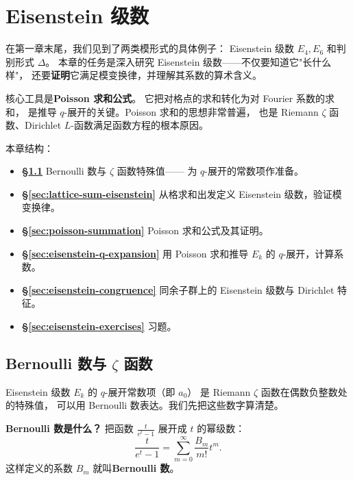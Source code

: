 \chapter{Eisenstein 级数}
\label{ch:eisenstein}

在第一章末尾，我们见到了两类模形式的具体例子：
Eisenstein 级数 $E_4, E_6$ 和判别形式 $\Delta$。
本章的任务是深入研究 Eisenstein 级数——不仅要知道它"长什么样"，
还要\textbf{证明}它满足模变换律，并理解其系数的算术含义。

核心工具是\textbf{Poisson 求和公式}。
它把对格点的求和转化为对 Fourier 系数的求和，
是推导 $q$-展开的关键。Poisson 求和的思想非常普遍，
也是 Riemann $\zeta$ 函数、Dirichlet $L$-函数满足函数方程的根本原因。

本章结构：
\begin{itemize}
  \item \textbf{§\ref{sec:bernoulli}} Bernoulli 数与 $\zeta$ 函数特殊值——
    为 $q$-展开的常数项作准备。
  \item \textbf{§\ref{sec:lattice-sum-eisenstein}}
    从格求和出发定义 Eisenstein 级数，验证模变换律。
  \item \textbf{§\ref{sec:poisson-summation}}
    Poisson 求和公式及其证明。
  \item \textbf{§\ref{sec:eisenstein-q-expansion}}
    用 Poisson 求和推导 $E_k$ 的 $q$-展开，计算系数。
  \item \textbf{§\ref{sec:eisenstein-congruence}}
    同余子群上的 Eisenstein 级数与 Dirichlet 特征。
  \item \textbf{§\ref{sec:eisenstein-exercises}} 习题。
\end{itemize}


\section{Bernoulli 数与 $\zeta$ 函数}
\label{sec:bernoulli}

Eisenstein 级数 $E_k$ 的 $q$-展开常数项（即 $a_0$）
是 Riemann $\zeta$ 函数在偶数负整数处的特殊值，
可以用 Bernoulli 数表达。我们先把这些数字算清楚。

\textbf{Bernoulli 数是什么？}
把函数 $\frac{t}{e^t - 1}$ 展开成 $t$ 的幂级数：
\[
  \frac{t}{e^t - 1} = \sum_{m=0}^{\infty} \frac{B_m}{m!} t^m.
\]
这样定义的系数 $B_m$ 就叫\textbf{Bernoulli 数}。

